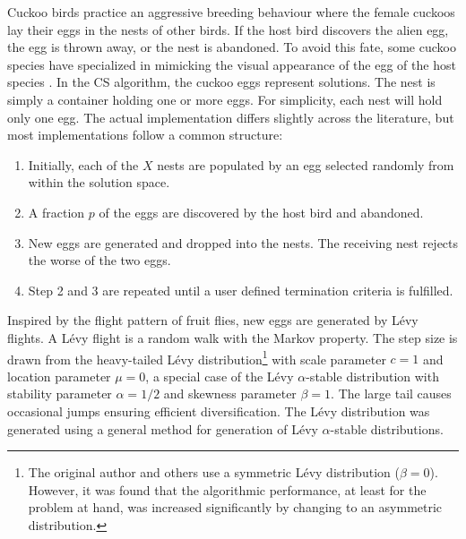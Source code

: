 \documentclass[a4paper, 12pt, sort&compress]{elsarticle}%
\begin{document}
Cuckoo birds practice an aggressive breeding behaviour where the female
cuckoos lay their eggs in the nests of other birds. If the host bird
discovers the alien egg, the egg is thrown away, or the nest is
abandoned. To avoid this fate, some cuckoo species have specialized in
mimicking the visual appearance of the egg of the host species
\cite{Payne2005}. In the CS algorithm, the cuckoo eggs represent
solutions. The nest is simply a container holding one or
more eggs. For simplicity, each nest will hold only one egg. The
actual implementation differs slightly across the
literature\cite{YangDeb,Walton,Tuba}, but most implementations follow
a common structure:

\begin{enumerate}
\item Initially, each of the $X$
  nests are populated by an egg selected randomly from within the
  solution space.
\item A fraction $p$ of the eggs are discovered by the host bird and
  abandoned.
\item New eggs are generated and dropped into the nests. The receiving
  nest rejects the worse of the two eggs.
\item Step 2 and 3 are repeated until a user defined termination
  criteria is fulfilled.
\end{enumerate}

Inspired by the flight pattern of fruit flies\cite{Reynolds}, new eggs
are generated by Lévy flights. A Lévy flight is a random walk with the
Markov property. The step size is drawn from the heavy-tailed Lévy
distribution\footnote{The original author and
  others\cite{YangDeb,Walton,Tuba} use a symmetric Lévy distribution
  ($\beta = 0$). However, it was found that the algorithmic performance,
  at least for the problem at hand, was increased significantly by
  changing to an asymmetric distribution.}
with scale parameter $c = 1$ and location parameter $\mu = 0$, a special
case of the Lévy $\alpha$-stable distribution with stability parameter
$\alpha = 1/2$ and skewness parameter $\beta = 1$. The large tail causes
occasional jumps ensuring efficient diversification. The Lévy
distribution was generated using a general method for generation of
Lévy $\alpha$-stable distributions\cite{Weron1994}.


\end{document}

